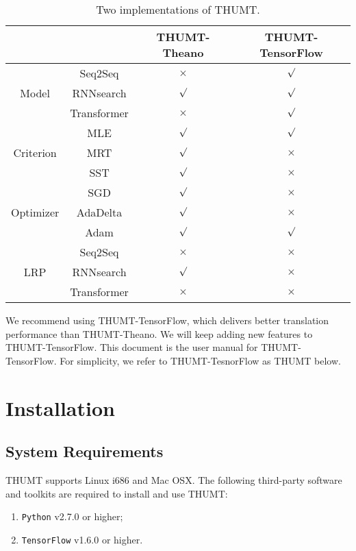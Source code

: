 \documentclass{article}
\begin{document}
\begin{table}[!t]
\centering
\begin{tabular}{|c|c|c|c|}
\cline{3-4}
\multicolumn{2}{c|}{} & THUMT-Theano & THUMT-TensorFlow \\
\hline
 & Seq2Seq &  $\times$ & $\surd$ \\
Model           & RNNsearch & $\surd$ & $\surd$ \\
           & Transformer & $\times$ & $\surd$ \\
\hline
 & MLE & $\surd$ & $\surd$ \\

Criterion               & MRT & $\surd$ & $\times$ \\
               & SST & $\surd$ & $\times$ \\
\hline
 & SGD & $\surd$ & $\times$ \\
Optimizer & AdaDelta & $\surd$ & $\times$ \\
 & Adam & $\surd$ & $\surd$ \\
\hline
  & Seq2Seq & $\times$ & $\times$ \\
LRP        & RNNsearch & $\surd$ & $\times$ \\
        & Transformer & $\times$ & $\times$ \\
\hline
\end{tabular}
\caption{Two implementations of THUMT.} \label{table:1:implementation}
\end{table}

We recommend using THUMT-TensorFlow, which delivers better translation performance than THUMT-Theano. We will keep adding new features to THUMT-TensorFlow. This document is the user manual for THUMT-TensorFlow. For simplicity, we refer to THUMT-TesnorFlow as THUMT below.


\section{Installation}

\subsection{System Requirements}
THUMT supports Linux i686 and Mac OSX. The following third-party software and toolkits are required to install and use THUMT:
\begin{enumerate}
\item \verb|Python| v2.7.0 or higher;
\item \verb|TensorFlow| v1.6.0 or higher.
\end{enumerate}
\end{document}
